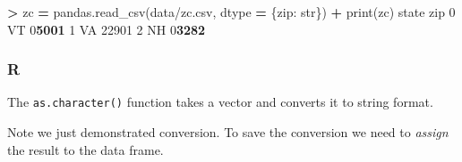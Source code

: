 \documentclass[
]{book}
\newenvironment{Shaded}{\begin{snugshade}}{\end{snugshade}}
\newcommand{\BuiltInTok}[1]{#1}
\newcommand{\CommentTok}[1]{\textcolor[rgb]{0.56,0.35,0.01}{\textit{#1}}}
\newcommand{\DecValTok}[1]{\textcolor[rgb]{0.00,0.00,0.81}{#1}}
\newcommand{\ErrorTok}[1]{\textcolor[rgb]{0.64,0.00,0.00}{\textbf{#1}}}
\newcommand{\FunctionTok}[1]{\textcolor[rgb]{0.00,0.00,0.00}{#1}}
\newcommand{\NormalTok}[1]{#1}
\newcommand{\OperatorTok}[1]{\textcolor[rgb]{0.81,0.36,0.00}{\textbf{#1}}}
\newcommand{\OtherTok}[1]{\textcolor[rgb]{0.56,0.35,0.01}{#1}}
\newcommand{\SpecialCharTok}[1]{\textcolor[rgb]{0.00,0.00,0.00}{#1}}
\newcommand{\StringTok}[1]{\textcolor[rgb]{0.31,0.60,0.02}{#1}}
\begin{document}
\begin{Shaded}
\begin{Highlighting}[]
\OperatorTok{\textgreater{}}\NormalTok{ zc }\OperatorTok{=}\NormalTok{ pandas.read\_csv(}\StringTok{\textquotesingle{}data/zc.csv\textquotesingle{}}\NormalTok{, dtype }\OperatorTok{=}\NormalTok{ \{}\StringTok{\textquotesingle{}zip\textquotesingle{}}\NormalTok{: }\StringTok{\textquotesingle{}str\textquotesingle{}}\NormalTok{\})}
\OperatorTok{+} \BuiltInTok{print}\NormalTok{(zc)}
\NormalTok{  state    }\BuiltInTok{zip}
\DecValTok{0}\NormalTok{    VT  }\DecValTok{0}\ErrorTok{5001}
\DecValTok{1}\NormalTok{    VA  }\DecValTok{22901}
\DecValTok{2}\NormalTok{    NH  }\DecValTok{0}\ErrorTok{3282}
\end{Highlighting}
\end{Shaded}

\hypertarget{r-22}{%
\subsubsection*{R}\label{r-22}}

The \texttt{as.character()} function takes a vector and converts it to string format.

\begin{Shaded}
\end{Shaded}

Note we just demonstrated conversion. To save the conversion we need to \emph{assign} the result to the data frame.

\begin{Shaded}
\end{Shaded}
\end{document}
